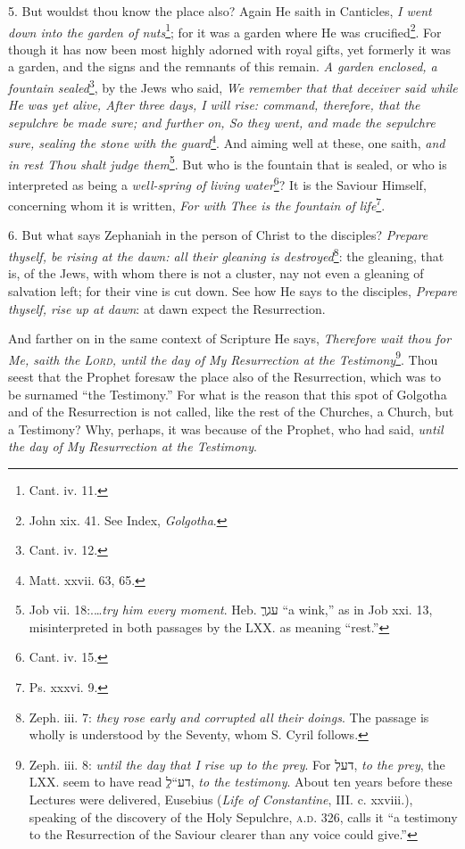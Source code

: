 5. But wouldst thou know the place also? Again He saith in Canticles, \emph{I went down into the garden of nuts}\footnote{Cant. iv. 11.}; for it was a garden where He was crucified\footnote{John xix. 41. See Index, \emph{Golgotha}.}. For though it has now been most highly adorned with royal gifts, yet formerly it was a garden, and the signs and the remnants of this remain. \emph{A garden enclosed, a fountain sealed}\footnote{Cant. iv. 12.}, by the Jews who said, \emph{We remember that that deceiver said while He was yet alive, After three days, I will rise: command, therefore, that the sepulchre be made sure; and further on, So they went, and made the sepulchre sure, sealing the stone with the guard}\footnote{Matt. xxvii. 63, 65.}. And aiming well at these, one saith, \emph{and in rest Thou shalt judge them}\footnote{Job vii. 18:.…\emph{try him every moment}. Heb. \texthebrew{ע\texthebrew{גרֶֶ}} “a wink,” as in Job xxi. 13, misinterpreted in both passages by the \textsc{LXX.} as meaning “rest.”}. But who is the fountain that is sealed, or who is interpreted as being a \emph{well-spring of living water}\footnote{Cant. iv. 15.}? It is the Saviour Himself, concerning whom it is written, \emph{For with Thee is the fountain of life}\footnote{Ps. xxxvi. 9.}.

6. But what says Zephaniah in the person of Christ to the disciples? \emph{Prepare thyself, be rising at the dawn: all their gleaning is destroyed}\footnote{Zeph. iii. 7: \emph{they rose early and corrupted all their doings}. The passage is wholly is understood by the Seventy, whom S. Cyril follows.}: the gleaning, that is, of the Jews, with whom there is not a cluster, nay not even a gleaning of salvation left; for their vine is cut down. See how He says to the disciples, \emph{Prepare thyself, rise up at dawn}: at dawn expect the Resurrection.

And farther on in the same context of Scripture He says, \emph{Therefore wait thou for Me, saith the \textsc{Lord,} until the day of My Resurrection at the Testimony}\footnote{Zeph. iii. 8: \emph{until the day that I rise up to the prey}. For \texthebrew{ד\texthebrew{עלְ}}, \emph{to the prey}, the \textsc{LXX.} seem to have read \texthebrew{ד\texthebrew{ע}“\texthebrew{לְְ}}, \emph{to the testimony}. About ten years before these Lectures were delivered, Eusebius (\emph{Life of Constantine}, III. c. xxviii.), speaking of the discovery of the Holy Sepulchre, \textsc{a.d.} 326, calls it “a testimony to the Resurrection of the Saviour clearer than any voice could give.”}. Thou seest that the Prophet foresaw the place also of the Resurrection, which was to be surnamed “the Testimony.” For what is the reason that this spot of Golgotha and of the Resurrection is not called, like the rest of the Churches, a Church, but a Testimony? Why, perhaps, it was because of the Prophet, who had said, \emph{until the day of My Resurrection at the Testimony}.

